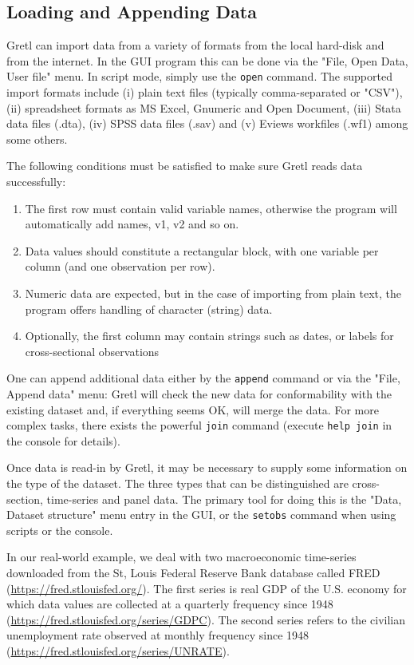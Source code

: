 \documentclass[11pt]{article}
\begin{document}
\subsection{Loading and Appending Data}
\label{sec:dataloadappend}
Gretl can import data from a variety of formats from the local hard-disk and from the internet. In the GUI program this can be done via the "File, Open Data, User file" menu. In script mode, simply use the \texttt{open} command. The supported import formats include (i) plain text files (typically comma-separated or "CSV"), (ii) spreadsheet formats as MS Excel, Gnumeric and Open Document, (iii) Stata data files (.dta), (iv) SPSS data files (.sav) and (v) Eviews workfiles (.wf1) among some others.

The following conditions must be satisfied to make sure Gretl reads data successfully:
\begin{enumerate}
	\item The first row must contain valid variable names, otherwise the program will automatically add names, v1, v2 and so on.
	\item Data values should constitute a rectangular block, with one variable per column (and one observation per row).
	\item Numeric data are expected, but in	the case of importing from plain text, the program offers handling of character (string) data.
	\item Optionally, the first column may contain strings such as	dates, or labels for cross-sectional observations
\end{enumerate}

One can append additional data either by the \texttt{append} command or via the "File, Append data" menu: Gretl will check the
new data for conformability with the existing dataset and, if everything seems OK, will merge the data. For more complex tasks, there exists the powerful \texttt{join} command (execute \texttt{help join} in the console for details).

Once data is read-in by Gretl, it may be necessary to supply some information on the type of the dataset. The three types that can be distinguished are cross-section, time-series and panel data. The primary tool for doing this is the "Data, Dataset structure" menu entry in the GUI, or the \texttt{setobs} command when using scripts or the console.

In our real-world example, we deal with two macroeconomic time-series downloaded from the St, Louis Federal Reserve Bank database called FRED (\url{https://fred.stlouisfed.org/}). The first series is real GDP of the U.S. economy for which data values are collected at a quarterly frequency since 1948 (\url{https://fred.stlouisfed.org/series/GDPC}). The second series refers to the civilian unemployment rate observed at monthly frequency since 1948 (\url{https://fred.stlouisfed.org/series/UNRATE}).
\end{document}
